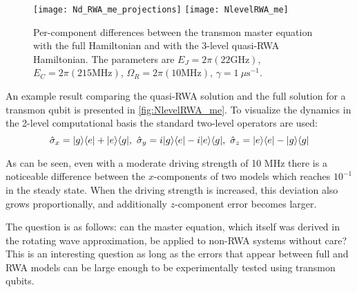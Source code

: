\begin{figure}
\centering
\texttt{[image: Nd\_RWA\_me\_projections]} \texttt{[image: NlevelRWA\_me]}
\caption{Per-component differences between the transmon master equation with the full Hamiltonian and with the 3-level quasi-RWA Hamiltonian. The parameters  are $E_J = 2\pi(22\text{GHz})$, $E_C = 2\pi(215\text{MHz})$, $\Omega_R = 2\pi(10 \text{MHz})$, $\gamma = 1\ \mu\text{s}^{-1}$.}
\label{fig:NlevelRWA_me}
\end{figure}

An example result comparing the quasi-RWA solution and the full solution for a transmon qubit is presented in \autoref{fig:NlevelRWA_me}. To visualize the dynamics in the 2-level computational basis the standard two-level operators are used: 
\[
\hat \sigma_x = \lvert g\rangle\langle e\rvert+\lvert e\rangle\langle g\rvert,\ \hat\sigma_y = i\lvert g\rangle\langle e\rvert - i\lvert e\rangle\langle g\rvert,\ \hat\sigma_z  = \lvert e\rangle\langle e\rvert-\lvert g\rangle\langle g\rvert
\]

As can be seen, even with a moderate driving strength of 10 MHz there is a noticeable difference between the $x$-components of two models which reaches $10^{-1}$ in the steady state. When the driving strength is increased, this deviation also grows proportionally, and additionally $z$-component error becomes larger.

The question is as follows: can the master equation, which itself was derived in the rotating wave approximation, be applied to non-RWA systems without care? This is an interesting question as long as the errors that appear between full and RWA models can be large enough to be experimentally tested using transmon qubits.


